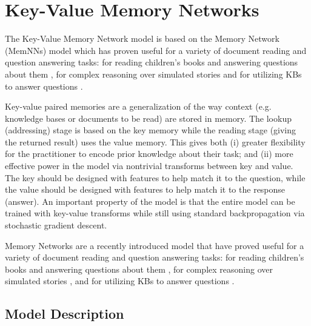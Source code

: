 \documentclass[11pt,letterpaper]{article}
\begin{document}
 
\section{Key-Value Memory Networks} \label{sec:models}
\vspace{-0.5ex}

\begin{figure*}[t!]
\centerline {
	\epsfxsize=6.5in
  }
  \caption{\label{fig:KV-Memnn_diagram} The Key-Value Memory Network model for question answering. See Section~\ref{sec:models} for details.}
\end{figure*}


The Key-Value Memory Network model is based on the  Memory Network (MemNNs)
model \citep{Weston14,sukhbaatar2015end} which has proven useful for a variety of
document reading and question answering tasks:
for reading children's books and answering questions about them \citep{hill2015goldilocks},
for complex reasoning over simulated stories \citep{weston2015towards}
and for utilizing KBs to answer questions \citep{bordes2015large}.

Key-value paired memories are a generalization of the way context (e.g. knowledge bases or
documents to be read) are stored in memory. The lookup (addressing) stage is based on the key
memory while the reading stage (giving the returned result) uses the value memory.
This gives both (i) greater flexibility for the practitioner to encode prior knowledge
about their task; and (ii) more effective power in the model via nontrivial
transforms between key and value.
The key should be designed with features to help match it to the question,
while the value should be designed with features to help match it to the response (answer).
An important property of the model is that the entire model
can be trained with key-value transforms
while still using standard backpropagation via stochastic gradient descent.



Memory Networks \citep{Weston14,sukhbaatar2015end}
 are a recently introduced model that have proved useful for a variety of
document reading and question answering tasks:
for reading children's books and answering questions about them \citep{hill2015goldilocks},
for complex reasoning over simulated stories \citep{weston2015towards},
and for utilizing KBs to answer questions \citep{bordes2015large}.
\fi

\subsection{Model Description}
\end{document}
